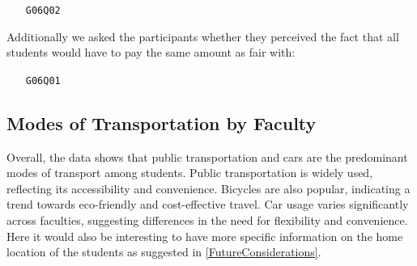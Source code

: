 \clearpage

\begin{enumerate}
    \item[\texttt{G06Q02}] 
\end{enumerate}

\begin{multicols}{2}
    
    \columnbreak
    
\end{multicols}

Additionally we asked the participants whether they perceived the fact that all students would have to pay the same amount as fair with:

\begin{enumerate}
    \item[\texttt{G06Q01}] 
\end{enumerate}

\begin{multicols}{2}
    
    \columnbreak
    
\end{multicols}

\pagebreak
\subsection{Modes of Transportation by Faculty}

Overall, the data shows that public transportation and cars are the predominant modes of transport among students. Public transportation is widely used, reflecting its accessibility and convenience. Bicycles are also popular, indicating a trend towards eco-friendly and cost-effective travel. Car usage varies significantly across faculties, suggesting differences in the need for flexibility and convenience. Here it would also be interesting to have more specific information on the home location of the students as suggested in \ref{FutureConsiderations}.
 
